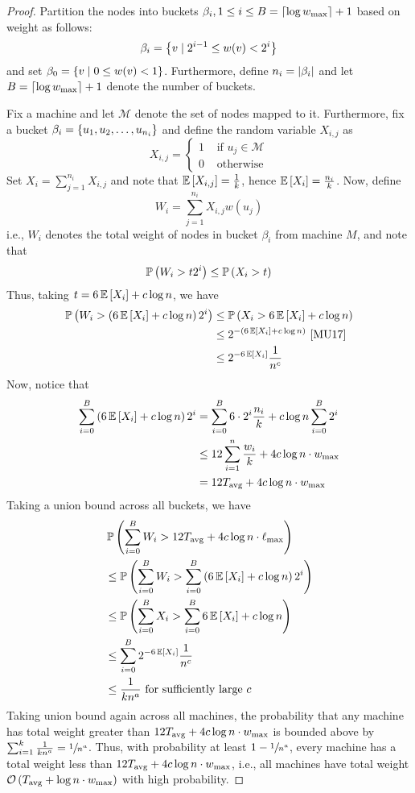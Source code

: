 \begin{proof}
    Partition the nodes into buckets \(\beta_i, 1 \leq i \leq B=\left\lceil\log{w_{\max}}\right\rceil + 1\) based on weight as follows:
	\[\beta_i = \left\lbrace v \mid 2^{i-1} \leq w(v) < 2^i\right\rbrace\]
	and set \(\beta_0=\left\lbrace v \mid 0 \leq w(v) < 1\right\rbrace\). 
	Furthermore, define \(n_i=\left\lvert\beta_i\right\rvert\) and let \(B=\left\lceil\log{w_{\max}}\right\rceil + 1\) denote the number of buckets.

	Fix a machine and let \(\mathcal{M}\) denote the set of nodes mapped to it. Furthermore, fix a bucket \(\beta_i=\left\lbrace u_1,u_2,\hdots,u_{n_i}\right\rbrace\) and define the random variable \(X_{i,j}\) as
	\[X_{i,j}=\begin{cases}
		1 & \text{ if } u_j \in \mathcal{M}\\
		0 & \text{ otherwise}
	\end{cases}\] Set \(X_i=\sum_{j=1}^{n_i} X_{i,j}\) and note that \(\operatorname{\mathbb{E}}\left[X_{i,j}\right]=\frac{1}{k}\), hence \(\operatorname{\mathbb{E}}\left[X_i\right]=\frac{n_i}{k}\).
	Now, define \[W_i=\sum_{j=1}^{n_i}X_{i,j}w(u_j)\] i.e., \(W_i\) denotes the total weight of nodes in bucket \(\beta_i\) from machine \(M\), and note that \[\operatorname{\mathbb{P}}\left(W_i > t2^i\right) \leq \operatorname{\mathbb{P}}\left(X_i >t\right)\] Thus, taking \(t = 6\operatorname{\mathbb{E}}\left[X_i\right] + c\log{n}\), we have
	\begin{align*}\operatorname{\mathbb{P}}\left(W_i > \left(6\operatorname{\mathbb{E}}\left[X_i\right] + c\log{n}\right)2^i\right)
		&\leq \operatorname{\mathbb{P}}\left(X_i > 6\operatorname{\mathbb{E}}\left[X_i\right] + c\log{n}\right)\\
		&\leq 2^{-\left(6\operatorname{\mathbb{E}}\left[X_i\right] + c\log{n}\right)}~\text{\cite{MU17}}\\
		&\leq 2^{-6\operatorname{\mathbb{E}}\left[X_i\right]}\frac{1}{n^c}
	\end{align*}
	Now, notice that
	\begin{align*}\sum_{i=0}^B \left(6\operatorname{\mathbb{E}}\left[X_i\right] + c\log{n}\right)2^i
		&=    \sum_{i=0}^B 6\cdot2^i\frac{n_i}{k} + c\log{n}\sum_{i=0}^B 2^i\\
		&\leq 12\sum_{i=1}^n\frac{w_i}{k} + 4c\log{n}\cdot w_{\max}\\ 
		&=   12T_{\operatorname{avg}} + 4c\log{n}\cdot w_{\max}\\
	\end{align*}
	Taking a union bound across all buckets, we have
	\begin{align*}&\prob{\sum_{i=0}^B W_i > 12T_{\avg} + 4c\log{n}\cdot\ell_{\max}}\\
		&\leq \prob{\sum_{i=0}^B W_i > \sum_{i=0}^B\left(6\expectation{X_i} + c\log{n}\right)2^i}\\
		&\leq \prob{\sum_{i=0}^B X_i > \sum_{i=0}^B 6\expectation{X_i} + c\log{n}}\\ 
		&\leq \sum_{i=0}^B 2^{-6\expectation{X_i}}\frac{1}{n^c}\\
		&\leq \frac{1}{kn^a}\text{ for sufficiently large }c
	\end{align*}
	Taking union bound again across all machines, the probability that any machine has total weight greater than \(12T_{\operatorname{avg}} + 4c\log{n}\cdot w_{\max}\) is bounded above by \(\sum_{i=1}^k\frac{1}{kn^a}=\sfrac{1}{n^a}\). Thus, with probability at least \(1 - \sfrac{1}{n^a}\), every machine has a total weight less than \(12T_{\operatorname{avg}} + 4c\log{n}\cdot w_{\max}\), i.e., all machines have total weight \(\mathcal{O}\left(T_{\operatorname{avg}} + \log{n}\cdot w_{\max}\right)\) with high probability. 
\end{proof}

